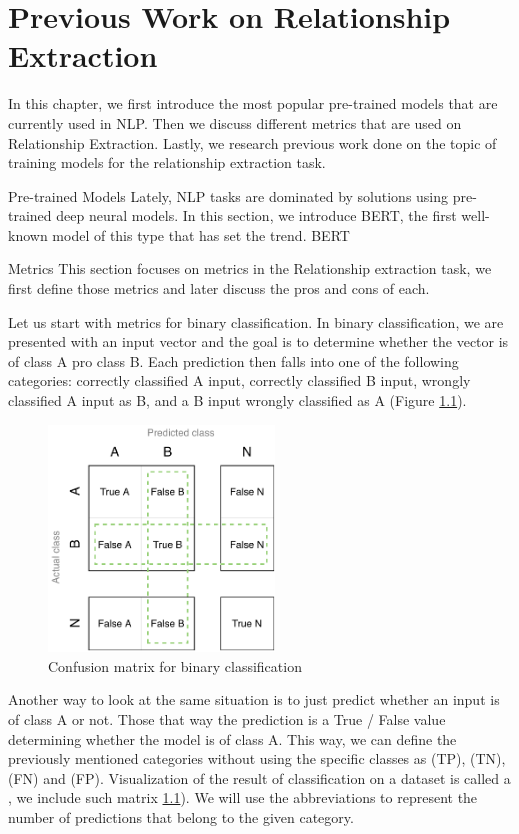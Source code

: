 \chapter{Previous Work on Relationship Extraction}
In this chapter, we first introduce the most popular pre-trained models that are currently used in NLP. Then we discuss different metrics that are used on Relationship Extraction. Lastly, we research previous work done on the topic of training models for the relationship extraction task.

Pre-trained Models
Lately, NLP tasks are dominated by solutions using pre-trained deep neural models. In this section, we introduce BERT, the first well-known model of this type that has set the trend.
BERT

Metrics
This section focuses on metrics in the Relationship extraction task, we first define those metrics and later discuss the pros and cons of each.

Let us start with metrics for binary classification. In binary classification, we are presented with an input vector and the goal is to determine whether the vector is of class A pro class B. Each prediction then falls into one of the following categories: correctly classified A input, correctly classified B input, wrongly classified A input as B, and a B input wrongly classified as A (Figure \ref{obr:CM}). 

\begin{figure}[h]\centering
\includegraphics[width=60mm]{./img//Diplomka diagramy-Big Confusion matric}
\caption{Confusion matrix for binary classification}
\label{obr:CM}
\end{figure}

Another way to look at the same situation is to just predict whether an input is of class A or not. Those that way the prediction is a True / False value determining whether the model is of class A. This way, we can define the previously mentioned categories without using the specific classes as  (TP),  (TN),  (FN) and  (FP). Visualization of the result of classification on a dataset is called a , we include such matrix \ref{obr:CM}). We will use the abbreviations to represent the number of predictions that belong to the given category.  



